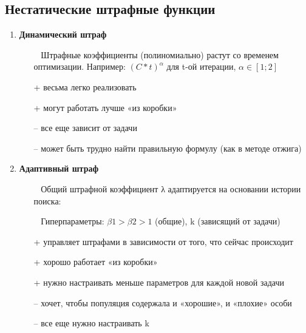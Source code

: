 \subsection{Нестатические штрафные функции}
\begin{enumerate}
    \item \textbf{Динамический штраф}
    \begin{itemize}
        \item [~] Штрафные коэффициенты (полиномиально) растут со временем оптимизации. Например: $(C * t)^\alpha$ для t-ой
        итерации, $\alpha \in [1; 2]$
        \item [+] весьма легко реализовать
        \item [+] могут работать лучше «из коробки»
        \item [--] все еще зависит от задачи
        \item [--] может быть трудно найти правильную формулу (как в методе отжига)
    \end{itemize}

    \item \textbf{Адаптивный штраф}
    \begin{itemize}
        \item [~] Общий штрафной коэффициент λ адаптируется на основании истории поиска:
        \item [~] Гиперпараметры: $\beta1 > \beta2 > 1$ (общие), k (зависящий от задачи)
        \item [+] управляет штрафами в зависимости от того, что сейчас происходит
        \item [+] хорошо работает «из коробки»
        \item [+] нужно настраивать меньше параметров для каждой новой задачи
        \item [--] хочет, чтобы популяция содержала и «хорошие», и «плохие» особи
        \item [--] все еще нужно настраивать k
    \end{itemize}
\end{enumerate}